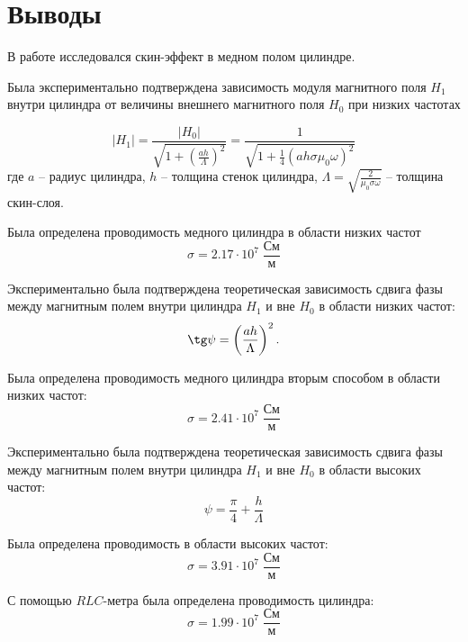 \section*{Выводы}

В работе исследовался скин-эффект в медном полом цилиндре.

Была экспериментально подтверждена зависимость модуля магнитного поля $H_1$ внутри цилиндра от величины внешнего магнитного поля $H_0$ при низких частотах 

$$
|H_1| = \frac{|H_0|}{\sqrt{1 + \left( \frac{ah}{\Lambda} \right)^2}} = \frac{1}{\sqrt{1 + \frac{1}{4} \left( a h \sigma \mu_0 \omega \right)^2}}
$$
где $a$ -- радиус цилиндра, $h$ -- толщина стенок цилиндра, $\Lambda = \sqrt{\frac{2}{\mu_0 \sigma \omega}}$ -- толщина скин-слоя.

Была определена проводимость медного цилиндра в области низких частот $$
\sigma = 2.17 \cdot 10^7 \; \frac{См}{м}
$$

Экспериментально была подтверждена теоретическая зависимость сдвига фазы между магнитным полем внутри цилиндра $H_1$ и вне $H_0$ в области низких частот:
$$
\tg \psi = \left( \frac{ah}{\Lambda} \right)^2.
$$

Была определена проводимость медного цилиндра вторым способом в области низких частот:
$$
\sigma = 2.41 \cdot 10^7 \; \frac{См}{м}
$$

Экспериментально была подтверждена теоретическая зависимость сдвига фазы между магнитным полем внутри цилиндра $H_1$ и вне $H_0$ в области высоких частот:
$$
\psi = \frac{\pi}{4} + \frac{h}{\Lambda}
$$

Была определена проводимость в области высоких частот:
$$
\sigma = 3.91 \cdot 10^7 \; \frac{См}{\text{м}}
$$

С помощью $RLC$-метра была определена проводимость цилиндра:
$$
\sigma = 1.99 \cdot 10^7 \; \frac{\text{См}}{\text{м}}
$$

